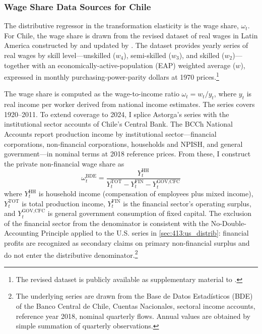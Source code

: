 \subsubsection{Wage Share Data Sources for Chile}
\label{sec:415:chile_distrib}

The distributive regressor in the transformation elasticity is the
wage share, $\omega_t$. For Chile, the wage share is drawn from the
revised dataset of real wages in Latin America constructed by
\citet{Astorga2017} and updated by \citet{Astorga2023}. The dataset
provides yearly series of real wages by skill level---unskilled
($w_4$), semi-skilled ($w_3$), and skilled ($w_2$)---together with
an economically-active-population (EAP) weighted average ($w$),
expressed in monthly purchasing-power-parity dollars at 1970
prices.\footnote{The revised dataset is publicly available as
	supplementary material to \citet{Astorga2023}.}

The wage share is computed as the wage-to-income ratio
$\omega_t = w_t / y_t$, where $y_t$ is real income per worker
derived from national income estimates. The \citet{Astorga2023}
series covers 1920--2011. To extend coverage to 2024, I splice 
Astorga's series with the institutional sector accounts of Chile's Central Bank. The BCCh National Accounts
report production income by institutional sector---financial
corporations, non-financial corporations, households and NPISH, and
general government---in nominal terms at 2018 reference prices.
From these, I construct the private non-financial wage share as
\begin{equation}
	\omega^{\text{BDE}}_t
	= \frac{Y^{\text{HH}}_t}
	{Y^{\text{TOT}}_t
		- Y^{\text{FIN}}_t
		- Y^{\text{GOV,CFC}}_t}
	\label{eq:414:wage_share_bde}
\end{equation}
where $Y^{\text{HH}}_t$ is household income (compensation of
employees plus mixed income), $Y^{\text{TOT}}_t$ is total production
income, $Y^{\text{FIN}}_t$ is the financial sector's operating
surplus, and $Y^{\text{GOV,CFC}}_t$ is general government
consumption of fixed capital. The exclusion of the financial sector
from the denominator is consistent with the No-Double-Accounting
Principle applied to the U.S. series in
\cref{sec:413:us_distrib}: financial profits are recognized as
secondary claims on primary non-financial surplus and do not enter
the distributive denominator.\footnote{The underlying series are
	drawn from the Base de Datos Estadísticos (BDE) of the Banco
	Central de Chile, Cuentas Nacionales, sectoral income accounts,
	reference year 2018, nominal quarterly flows. Annual values are
	obtained by simple summation of quarterly observations.}

